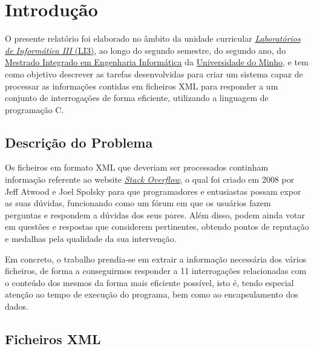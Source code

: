 \documentclass[a4paper]{article}
\begin{document}
\tableofcontents


\pagebreak

\section{Introdução}
\label{sec:intro}

O presente relatório foi elaborado no âmbito da unidade curricular
\href{http://miei.di.uminho.pt/plano_estudos.html#laborat_rios_de_inform_tica_iii}
{\emph {Laboratórios de Informática III} (LI3)}, ao longo do segundo semestre,
do segundo ano, do \href{http://miei.di.uminho.pt}{Mestrado Integrado em Engenharia Informática}
da \href{https://www.uminho.pt}{Universidade do Minho}, e tem como objetivo
descrever as tarefas desenvolvidas para criar um sistema capaz de processar as
informações contidas em ficheiros XML para responder a um conjunto de
interrogações de forma eficiente, utilizando a linguagem de programação C.


\subsection{Descrição do Problema}
\label{sec:problema}

Os ficheiros em formato XML que deveriam ser processados continham informação referente ao
website \href{https://stackoverflow.com/}{\textit{Stack Overflow}}, o qual foi
criado em 2008 por Jeff Atwood e Joel Spolsky para que programadores e
entusiastas possam expor as suas dúvidas, funcionando como um fórum em que os usuários fazem
perguntas e respondem a dúvidas dos seus pares. Além disso, podem ainda votar
em questões e respostas que considerem pertinentes, obtendo pontos de reputação
e medalhas pela qualidade da sua intervenção.

Em concreto, o trabalho prendia-se em extrair a informação necessária dos vários
ficheiros, de forma a conseguirmos responder a 11 interrogações relacionadas com
o conteúdo dos mesmos da forma mais eficiente possível, isto é, tendo especial
atenção ao tempo de execução do programa, bem como ao encapsulamento dos dados.

\subsection{Ficheiros XML}
\label{sec:xml}
\end{document}
